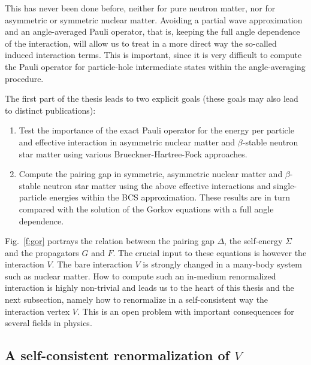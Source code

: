 \documentclass{svmult}
\begin{document}
This has never been done before, neither for pure neutron matter,
nor for asymmetric or symmetric nuclear matter. 
Avoiding  a partial wave approximation and an angle-averaged
Pauli operator, that is, keeping the full angle dependence of the 
interaction, will allow us to treat in a more direct way
the so-called induced interaction terms. 
This is important, since it is very difficult to compute the
Pauli operator for particle-hole intermediate states 
within the angle-averaging procedure.

The first part of the thesis leads to two explicit goals (these goals
may also lead to distinct publications):
\begin{enumerate} 
  \item Test the importance of the exact Pauli operator for the 
          energy per particle and effective interaction 
          in asymmetric nuclear matter and $\beta$-stable neutron star 
          matter 
          using various  Brueckner-Hartree-Fock approaches.
  \item Compute the pairing gap in symmetric, asymmetric nuclear matter 
        and $\beta$-stable neutron star 
          matter using the above effective interactions and single-particle
        energies within the BCS approximation. These results are in turn
        compared with the solution of the Gorkov equations with a full
        angle dependence.
\end{enumerate}


Fig.~\ref{f:gor} portrays  the relation between the pairing gap
$\Delta$, the self-energy $\Sigma$ and the propagators $G$ and $F$.
The crucial input to these equations is however the interaction $V$. 
The bare interaction $V$ is strongly changed in a many-body
system such as nuclear matter. How to compute such an in-medium
renormalized interaction
is highly non-trivial and 
leads us to the heart of this thesis and the next subsection, namely
how to renormalize in a self-consistent way the interaction vertex
$V$. This is an open problem with important consequences for several
fields in physics.


\subsection{A self-consistent renormalization of $V$}
\label{s:pol}
\end{document}
